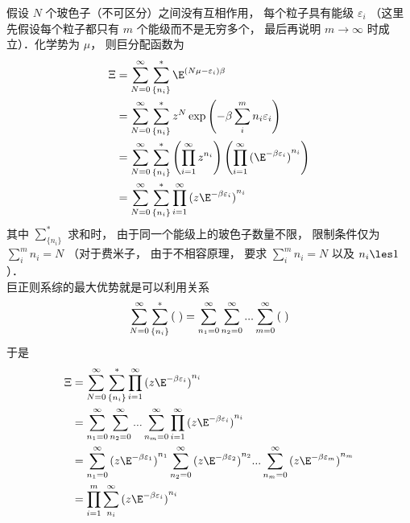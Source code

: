 
假设 $N$ 个玻色子（不可区分）之间没有互相作用， 每个粒子具有能级 ${\varepsilon_i}$ （这里先假设每个粒子都只有 $m$ 个能级而不是无穷多个， 最后再说明 $m \to \infty $ 时成立）．化学势为 $\mu $，  则巨分配函数为
\begin{equation}
  \begin{aligned}
\Xi & = \sum\limits_{N = 0}^\infty  {\sum\limits_{\{ {n_i}\} }^ *  {\E^{(N\mu  - {\varepsilon_i})\beta }} }  \\
& = \sum\limits_{N = 0}^\infty  {\sum\limits_{\{ {n_i}\} }^ *  {{z^N}\exp \left( { - \beta \sum\limits_i^m {{n_i}{\varepsilon_i}} } \right)} }  \\
& = \sum\limits_{N = 0}^\infty  {\sum\limits_{\{ {n_i}\} }^ *  {\left( {\prod\limits_{i = 1}^\infty  {z^{n_i}} } \right)\left( {\prod\limits_{i = 1}^\infty  {{({\E^{ - \beta {\varepsilon_i}}})}^{n_i}} } \right)} } \\
& = \sum\limits_{N = 0}^\infty  {\sum\limits_{\{ {n_i}\} }^ *  {\prod\limits_{i = 1}^\infty  {{(z{\E^{ - \beta {\varepsilon_i}}})}^{n_i}} } }
\end{aligned}
\end{equation}
其中 $\sum\limits_{\{ {n_i}\} }^ *  {} $ 求和时， 由于同一个能级上的玻色子数量不限， 限制条件仅为 $\sum\limits_i^m {n_i}  = N$ （对于费米子， 由于不相容原理， 要求 $\sum\limits_i^m {n_i}  = N$ 以及 ${n_i} \les 1$ ）．\\
巨正则系综的最大优势就是可以利用关系
\begin{equation}
  \sum\limits_{N = 0}^\infty  {\sum\limits_{\{ {n_i}\} }^ *  {({\kern 1pt} {\kern 1pt} {\kern 1pt} )} }  = \sum\limits_{{n_1} = 0}^\infty  {\sum\limits_{{n_2} = 0}^\infty  {...\sum\limits_{m = 0}^\infty  {({\kern 1pt} {\kern 1pt} {\kern 1pt} )} } } 
\end{equation}
于是
\begin{equation}
  \begin{aligned}
\Xi & = \sum\limits_{N = 0}^\infty  {\sum\limits_{\{ {n_i}\} }^ *  {\prod\limits_{i = 1}^\infty  {{(z{\E^{ - \beta {\varepsilon_i}}})}^{n_i}} } }  \\
& = \sum\limits_{{n_1} = 0}^\infty  {\sum\limits_{{n_2} = 0}^\infty  {...\sum\limits_{{n_m} = 0}^\infty  {\prod\limits_{i = 1}^\infty  {{(z{\E^{ - \beta {\varepsilon_i}}})}^{n_i}} } } }  \\
& = \sum\limits_{{n_1} = 0}^\infty  {{{(z{\E^{ - \beta {\varepsilon_1}}})}^{n_1}}\sum\limits_{{n_2} = 0}^\infty  {{{(z{\E^{ - \beta {\varepsilon_2}}})}^{n_2}}...\sum\limits_{{n_m} = 0}^\infty  {{(z{\E^{ - \beta {\varepsilon_m}}})}^{n_m}} } } \\
& = \prod\limits_{i = 1}^m {\sum\limits_{n_i}^\infty  {{(z{\E^{ - \beta {\varepsilon_i}}})}^{n_i}} }
\end{aligned}
\end{equation}
